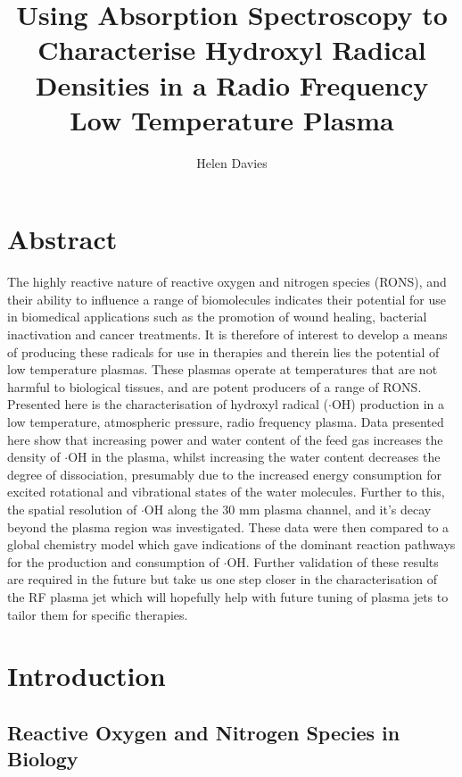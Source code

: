 \documentclass[11pt, oneside]{article}   	%
\title{Using Absorption Spectroscopy to Characterise Hydroxyl Radical Densities in a Radio Frequency Low Temperature Plasma}
\author{Helen Davies}
\date{}							%
\begin{document}
\maketitle

\section{Abstract}

The highly reactive nature of reactive oxygen and nitrogen species (RONS), and their ability to influence a range of biomolecules indicates their potential for use in biomedical applications such as the promotion of wound healing, bacterial inactivation and cancer treatments.
It is therefore of interest to develop a means of producing these radicals for use in therapies and therein lies the potential of low temperature plasmas.
These plasmas operate at temperatures that are not harmful to biological tissues, and are potent producers of a range of RONS.
Presented here is the characterisation of hydroxyl radical ($\cdot$OH) production in a low temperature, atmospheric pressure, radio frequency plasma.
Data presented here show that increasing power and water content of the feed gas increases the density of $\cdot$OH in the plasma, whilst increasing the water content decreases the degree of dissociation, presumably due to the increased energy consumption for excited rotational and vibrational states of the water molecules.
Further to this, the spatial resolution of $\cdot$OH along the 30 mm plasma channel, and it's decay beyond the plasma region was investigated. These data were then compared to a global chemistry model which gave indications of the dominant reaction pathways for the production and consumption of $\cdot$OH.
Further validation of these results are required in the future but take us one step closer in the characterisation of the RF plasma jet which will hopefully help with future tuning of plasma jets to tailor them for specific therapies.

\section{Introduction}

\subsection{Reactive Oxygen and Nitrogen Species in Biology} \label{sec:RONSinBiology}
\end{document}
